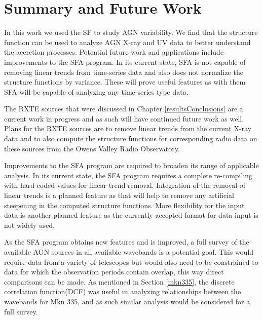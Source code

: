 \documentclass[12pt, oneside]{smuthesis}
\begin{document}
\chapter{\sc Summary and Future Work} \label{futureWork}

In this work we used the SF to study AGN variability. We find that the structure function can be used to analyze AGN X-ray and UV data to better understand the accretion processes. Potential future work and applications include improvements to the SFA program. In its current state, SFA is not capable of removing linear trends from time-series data and also does not normalize the structure functions by variance. These will prove useful features as with them SFA will be capable of analyzing any time-series type data.

The RXTE sources that were discussed in Chapter \ref{resultsConclusions} are a current work in progress and as such will have continued future work as well. Plans for the RXTE sources are to remove linear trends from the current X-ray data and to also compute the structure functions for corresponding radio data on these sources from the Owens Valley Radio Observatory.

Improvements to the SFA program are required to broaden its range of applicable analysis. In its current state, the SFA program requires a complete re-compiling with hard-coded values for linear trend removal. Integration of the removal of linear trends is a planned feature as that will help to remove any artificial steepening in the computed structure functions. More flexibility for the input data is another planned feature as the currently accepted format for data input is not widely used.

As the SFA program obtains new features and is improved, a full survey of the available AGN sources in all available wavebands is a potential goal. This would require data from a variety of telescopes but would also need to be constrained to data for which the observation periods contain overlap, this way direct comparisons can be made. As mentioned in Section \ref{mkn335}, the discrete correlation function(DCF) was useful in analyzing relationships between the wavebands for Mkn 335, and as such similar analysis would be considered for a full survey. 

\appendix



\begin{singlespace}

\end{singlespace}
\end{document}
